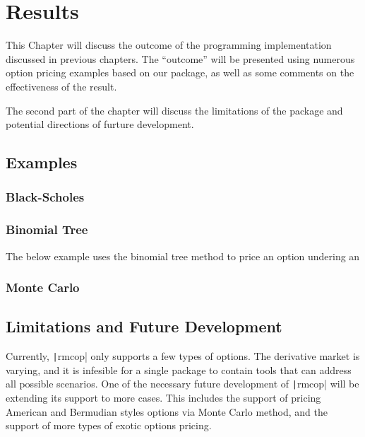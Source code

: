 \chapter{Results} \label{cpt:Results}

This Chapter will discuss the outcome of the programming implementation discussed in previous chapters. The ``outcome'' will be presented using numerous option pricing examples based on our package, as well as some comments on the effectiveness of the result.

The second part of the chapter will discuss the limitations of the package and potential directions of furture development.

\section{Examples}

\subsection{Black-Scholes}

\subsection{Binomial Tree} \label{ex:binomial_tree}



The below example uses the binomial tree method to price an option undering an 


\subsection{Monte Carlo}

\section{Limitations and Future Development}

Currently, \texttt|rmcop| only supports a few types of options. The derivative market is varying, and it is infesible for a single package to contain tools that can address all possible scenarios. One of the necessary future development of \texttt|rmcop| will be extending its support to more cases. This includes the support of pricing American and Bermudian styles options via Monte Carlo method, and the support of more types of exotic options pricing.

